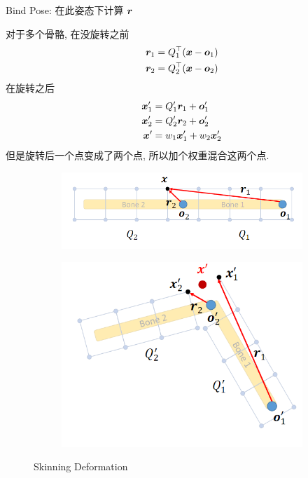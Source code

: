 Bind Pose: 在此姿态下计算 ${\bm{r}}$

对于多个骨骼, 在没旋转之前
\begin{align*}
    {\bm{r}}_1&= Q_1^\top ({\bm{x}}-{\bm{o}}_1)\\
    {\bm{r}}_2&=Q_2^\top ({\bm{x}}-{\bm{o}}_2)
\end{align*}
在旋转之后
\begin{align*}
    {\bm{x}}'_1&=Q_1'{\bm{r}}_1 + {\bm{o}}_1'\\
    {\bm{x}}'_2&=Q_2'{\bm{r}}_2 + {\bm{o}}_2'\\
    {\bm{x}}' &= w_1{\bm{x}}_1'+w_2{\bm{x}}_2'
\end{align*}
但是旋转后一个点变成了两个点, 所以加个权重混合这两个点.

\begin{figure}[!htb]
    \centering
    \begin{subfigure}{0.618\linewidth}
        \centering
        \includegraphics[width=\linewidth]{pic/1057/Skinning Deformation1}
    \end{subfigure}
    \begin{subfigure}{0.618\linewidth}
        \centering
        \includegraphics[width=\linewidth]{pic/1057/Skinning Deformation2}
    \end{subfigure}
    \caption{Skinning Deformation}
\end{figure}



